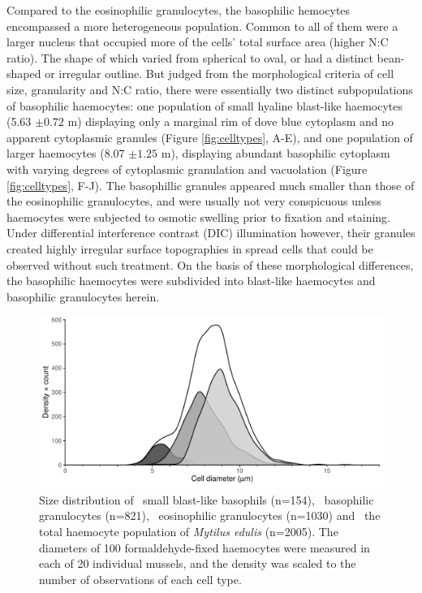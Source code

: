 Compared to the eosinophilic granulocytes, the basophilic hemocytes encompassed a more heterogeneous population. Common to all of them were a larger nucleus that occupied more of the cells' total surface area (higher N:C ratio). The shape of which varied from spherical to oval, or had a distinct bean-shaped or irregular outline. But judged from the morphological criteria of cell size, granularity and N:C ratio, there were essentially two distinct subpopulations of basophilic haemocytes: one population of small hyaline blast-like haemocytes (5.63 $\pm{0.72}$ \micro m) displaying only a marginal rim of dove blue cytoplasm and no apparent cytoplasmic granules (Figure \ref{fig:celltypes}, A-E), and one population of larger haemocytes (8.07 $\pm{1.25}$ \micro m), displaying abundant basophilic cytoplasm with varying degrees of cytoplasmic granulation and vacuolation (Figure \ref{fig:celltypes}, F-J). The basophillic granules appeared much smaller than those of the eosinophilic granulocytes, and were usually not very conspicuous unless haemocytes were subjected to osmotic swelling prior to fixation and staining. Under differential interference contrast (DIC) illumination however, their granules created highly irregular surface topographies in spread cells that could be observed without such treatment. On the basis of these morphological differences, the basophilic haemocytes were subdivided into blast-like haemocytes and basophilic granulocytes herein. 

\begin{figure}[H]
    \centering
    \includegraphics[width=1.0\textwidth]{figures/Anatomy/diameters scaled density plot.pdf}
    \caption{Size distribution of \protect\dimgraybox \ small blast-like basophils (n=154), \protect\lightgraybox \ basophilic granulocytes (n=821), \protect\lysegraabox \ eosinophilic granulocytes (n=1030) and \protect\whitebox \ the total haemocyte population of \emph{Mytilus edulis} (n=2005). The diameters of 100 formaldehyde-fixed haemocytes were measured in each of 20 individual mussels, and the density was scaled to the number of observations of each cell type.}
    \label{fig:Diameters}
\end{figure}


